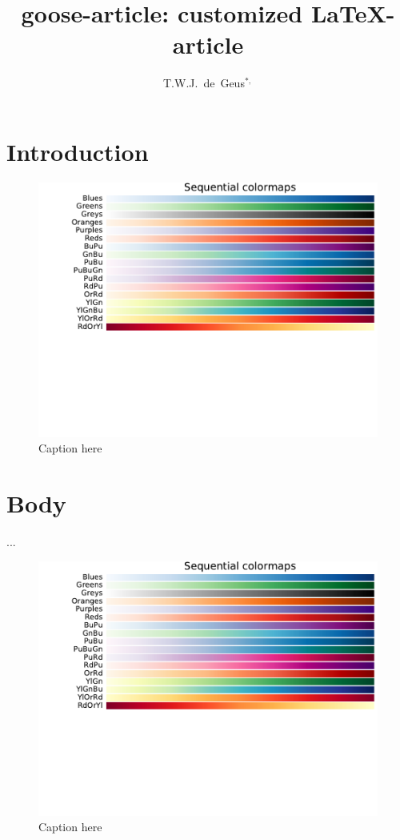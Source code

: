 \documentclass{goose-article}
\title{goose-article: customized \LaTeX-article}
\author[1]{T.W.J.~de~Geus$^{*,}$}
\affil[1]{
  Physics Institute, \'{E}cole Polytechnique F\'{e}d\'{e}rale de Lausanne (EPFL) \nl
  Switzerland
}
\begin{document}
\maketitle

\begin{abstract}
\noindent
\lipsum[1]

\end{abstract}

\section{Introduction}
\lipsum[2-4] \citep{Geus10,Geus11,Geus12}

\begin{figure}[htp]
  \centering
  \includegraphics[width=.5\linewidth]{figure_1}
  \caption{Caption here}
  \label{fig:a}
\end{figure}

\section{Body}
\lipsum[5-10] \citet{Geus13} ...

\begin{figure}[htp]
  \centering
  \includegraphics[width=.5\linewidth]{figure_1}
  \caption{Caption here}
  \label{fig:b}
\end{figure}


\end{document}
